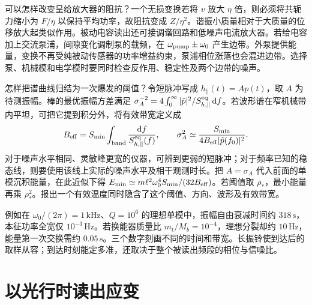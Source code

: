 可以怎样改变呈给放大器的阻抗？一个无损变换若将 $v$ 放大 $\eta$ 倍，则必须将共轭力缩小为 $F/\eta$ 以保持平均功率，故阻抗变成 $Z/\eta^2$。谐振小质量相对于大质量的位移放大起类似作用。被动电容读出还可接调谐回路和低噪声电流放大器。若给电容加上交流泵浦，间隙变化调制泵的载频，在 $\omega_{\rm pump}\pm\omega_0$ 产生边带。外泵提供能量，变换不再受纯被动传感器的功率增益约束，泵浦相位涨落也会混进边带。选择泵、机械模和电学模时要同时检查反作用、稳定性及两个边带的噪声。

怎样把谱曲线归结为一次爆发的阈值？令短脉冲写成 $h_\parallel(t)=A p(t)$，取 $A$ 为待测振幅。棒的最优振幅方差满足 $\sigma_A^{-2}=4\int_0^\infty|\tilde p|^2/S_{h,\parallel}^{\rm eq}\,\dd f$。若波形谱在窄机械带内平坦，可把它提到积分外，将有效带宽定义成
\[
 B_{\rm eff}=S_{\min}\int_{\rm band}\frac{\dd f}{S_{h,\parallel}^{\rm eq}(f)},
 \qquad
 \sigma_A^2\simeq \frac{S_{\min}}{4B_{\rm eff}|\tilde p(f_0)|^2}.
\]
对于噪声水平相同、灵敏峰更宽的仪器，可辨到更弱的短脉冲；对于频率已知的稳态线，则要使用该线上实际的噪声水平及相干观测时长。把 $A=\sigma_A$ 代入前面的单模沉积能量，在此近似下得 $E_{\min}\simeq m\ell^2\omega_0^4S_{\min}/(32 B_{\rm eff})$。若阈值取 $\rho_*$，最小能量再乘 $\rho_*^2$。报出一个有效温度同时隐含了这个阈值、方向、波形及有效带宽。

例如在 $\omega_0/(2\pi)=1\,\mathrm{kHz}$、$Q=10^6$ 的理想单模中，振幅自由衰减时间约 $318\,\mathrm{s}$，本征功率全宽仅 $10^{-3}\,\mathrm{Hz}$。若换能器质量比 $m_t/M_b=10^{-4}$，理想分裂却约 $10\,\mathrm{Hz}$，能量第一次交换需约 $0.05\,\mathrm{s}$。三个数字刻画不同的时间和带宽。长振铃使到达后的取样从容；到达时刻能定多准，还取决于整个被读出频段的相位与信噪比。

\section{以光行时读出应变}\label{sec:gw-b-optic}
